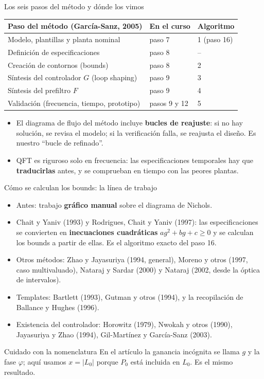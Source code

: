 \documentclass[aspectratio=169,11pt]{beamer}
\begin{document}
\begin{frame}{Los seis pasos del método y dónde los vimos}
  \small
  \begin{center}\footnotesize
  \begin{tabular}{lll}
    \hline
    Paso del método (García-Sanz, 2005) & En el curso & Algoritmo\\
    \hline
    Modelo, plantillas y planta nominal & paso 7 & 1 (paso 16)\\
    Definición de especificaciones & paso 8 & --\\
    Creación de contornos (bounds) & paso 8 & 2\\
    Síntesis del controlador $G$ (loop shaping) & paso 9 & 3\\
    Síntesis del prefiltro $F$ & paso 9 & 4\\
    Validación (frecuencia, tiempo, prototipo) & pasos 9 y 12 & 5\\
    \hline
  \end{tabular}
  \end{center}
  \begin{itemize}
    \item El diagrama de flujo del método incluye \textbf{bucles de reajuste}: si no hay solución, se revisa el modelo; si la verificación falla, se reajusta el diseño. Es nuestro ``bucle de refinado''.
    \item QFT es riguroso solo en frecuencia: las especificaciones temporales hay que \textbf{traducirlas} antes, y se comprueban en tiempo con las peores plantas.
  \end{itemize}
\end{frame}

\begin{frame}{Cómo se calculan los bounds: la línea de trabajo}
  \small
  \begin{itemize}
    \item Antes: trabajo \textbf{gráfico manual} sobre el diagrama de Nichols.
    \item Chait y Yaniv (1993) y Rodrigues, Chait y Yaniv (1997): las especificaciones se convierten en \textbf{inecuaciones cuadráticas} $a g^2+bg+c\ge0$ y se calculan los bounds a partir de ellas. Es el algoritmo exacto del paso 16.
    \item Otros métodos: Zhao y Jayasuriya (1994, general), Moreno y otros (1997, caso multivaluado), Nataraj y Sardar (2000) y Nataraj (2002, desde la óptica de intervalos).
    \item Templates: Bartlett (1993), Gutman y otros (1994), y la recopilación de Ballance y Hughes (1996).
    \item Existencia del controlador: Horowitz (1979), Nwokah y otros (1990), Jayasuriya y Zhao (1994), Gil-Martínez y García-Sanz (2003).
  \end{itemize}
  \begin{alertblock}{Cuidado con la nomenclatura}
    En el artículo la ganancia incógnita se llama $g$ y la fase $\varphi$; aquí usamos $x=|L_0|$ porque $P_0$ está incluida en $L_0$. Es el mismo resultado.
  \end{alertblock}
\end{frame}
\end{document}
